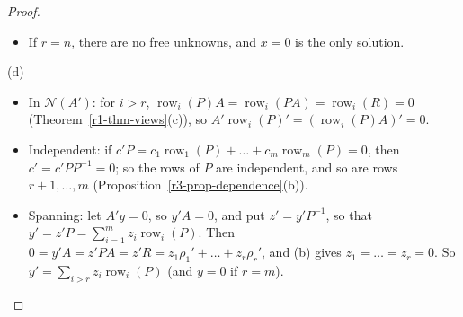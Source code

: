 \documentclass[12pt]{article}
\DeclareMathOperator{\row}{row}
\DeclareMathOperator{\Span}{span}
\theoremstyle{definition}
\begin{document}
\begin{proof}
\begin{itemize}
computed from its free unknowns: \(x_{k_i}=-\sum_lR_{if_l}x_{f_l}\). So two solutions with the same free unknowns are
equal, and \(t=\tilde t\in\Span\{s_1,\dots,s_{n-r}\}\).
\item If \(r=n\), there are no free unknowns, and \(x=0\) is the only solution.
\end{itemize}
(d)
\begin{itemize}
\item In \(\mathcal N(A')\): for \(i>r\), \(\row_i(P)A=\row_i(PA)=\row_i(R)=0\) (Theorem~\ref{r1-thm-views}(c)), so
\(A'\row_i(P)'=(\row_i(P)A)'=0\).
\item Independent: if \(c'P=c_1\row_1(P)+\dots+c_m\row_m(P)=0\), then \(c'=c'PP^{-1}=0\); so the
rows of \(P\) are independent, and so are rows \(r+1,\dots,m\)
(Proposition~\ref{r3-prop-dependence}(b)).
\item Spanning: let \(A'y=0\), so \(y'A=0\), and put \(z'=y'P^{-1}\), so that
\(y'=z'P=\sum_{i=1}^mz_i\row_i(P)\). Then \(0=y'A=z'PA=z'R=z_1\rho_1'+\dots+z_r\rho_r'\), and (b)
gives \(z_1=\dots=z_r=0\). So \(y'=\sum_{i>r}z_i\row_i(P)\) (and \(y=0\) if \(r=m\)).\qedhere
\end{itemize}
\end{proof}
\end{document}
